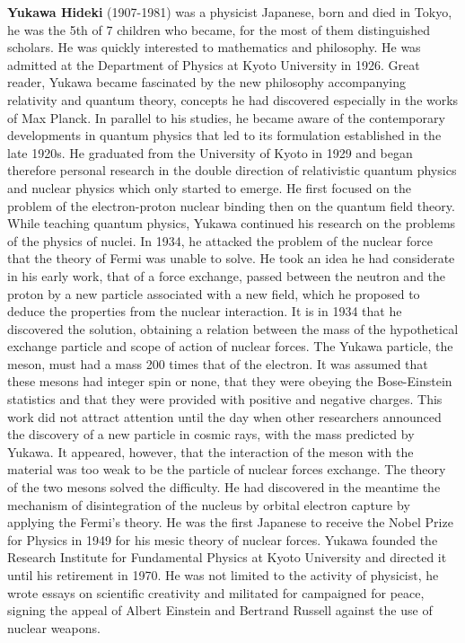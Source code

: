 \textbf{Yukawa Hideki} (1907-1981) was a physicist Japanese, born and died in Tokyo, he was the 5th of 7 children who became, for the most of them distinguished scholars. He was quickly interested to mathematics and philosophy. He was admitted at the Department of Physics at Kyoto University in 1926. Great reader, Yukawa became fascinated by the new philosophy accompanying relativity and quantum theory, concepts he had discovered especially in the works of Max Planck. In parallel to his studies, he became aware of the contemporary developments in quantum physics that led to its formulation established in the late 1920s. He graduated from the University of Kyoto in 1929 and began therefore personal research in the double direction of relativistic quantum physics and nuclear physics which only started to emerge. He first focused on the problem of the electron-proton nuclear binding then on the quantum field theory. While teaching quantum physics, Yukawa continued his research on the problems of the physics of nuclei. In 1934, he attacked the problem of the nuclear force that the theory of Fermi was unable to solve. He took an idea he had considerate in his early work, that of a force exchange, passed between the neutron and the proton by a new particle associated with a new field, which he proposed to deduce the properties from the nuclear interaction. It is in  1934 that he discovered the solution, obtaining a relation between the mass of the hypothetical exchange particle and scope of action of nuclear forces. The Yukawa particle, the meson, must had a mass 200 times that of the electron. It was assumed that these mesons had integer spin or none, that they were obeying the Bose-Einstein statistics and that they were provided with positive and negative charges. This work did not attract attention until the day when other researchers announced the discovery of a new particle in cosmic rays, with the mass predicted by Yukawa. It appeared, however, that the interaction of the meson with the material was too weak to be the particle of nuclear forces exchange. The theory of the two mesons solved the difficulty. He had discovered in the meantime the mechanism of disintegration of the nucleus by orbital electron capture by applying the Fermi's theory. He was the first Japanese to receive the Nobel Prize for Physics in 1949 for his mesic theory of nuclear forces. Yukawa founded the Research Institute for Fundamental Physics at Kyoto University and directed it until his retirement in 1970. He was not limited to the activity of physicist, he wrote essays on scientific creativity and militated for campaigned for peace, signing the appeal of Albert Einstein and Bertrand Russell against the use of nuclear weapons.



